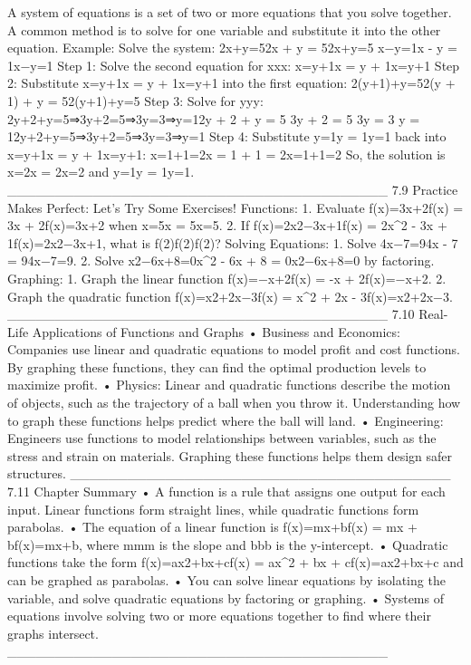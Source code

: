 A system of equations is a set of two or more equations that you solve together. A common method is to solve for one variable and substitute it into the other equation.
Example: Solve the system:
2x+y=52x + y = 52x+y=5 x−y=1x - y = 1x−y=1
Step 1: Solve the second equation for xxx:
x=y+1x = y + 1x=y+1
Step 2: Substitute x=y+1x = y + 1x=y+1 into the first equation:
2(y+1)+y=52(y + 1) + y = 52(y+1)+y=5
Step 3: Solve for yyy:
2y+2+y=5⇒3y+2=5⇒3y=3⇒y=12y + 2 + y = 5 \quad \Rightarrow \quad 3y + 2 = 5 \quad \Rightarrow \quad 3y = 3 \quad \Rightarrow \quad y = 12y+2+y=5⇒3y+2=5⇒3y=3⇒y=1
Step 4: Substitute y=1y = 1y=1 back into x=y+1x = y + 1x=y+1:
x=1+1=2x = 1 + 1 = 2x=1+1=2
So, the solution is x=2x = 2x=2 and y=1y = 1y=1.
________________________________________
7.9 Practice Makes Perfect: Let’s Try Some Exercises!
Functions:
1.	Evaluate f(x)=3x+2f(x) = 3x + 2f(x)=3x+2 when x=5x = 5x=5.
2.	If f(x)=2x2−3x+1f(x) = 2x^2 - 3x + 1f(x)=2x2−3x+1, what is f(2)f(2)f(2)?
Solving Equations:
1.	Solve 4x−7=94x - 7 = 94x−7=9.
2.	Solve x2−6x+8=0x^2 - 6x + 8 = 0x2−6x+8=0 by factoring.
Graphing:
1.	Graph the linear function f(x)=−x+2f(x) = -x + 2f(x)=−x+2.
2.	Graph the quadratic function f(x)=x2+2x−3f(x) = x^2 + 2x - 3f(x)=x2+2x−3.
________________________________________
7.10 Real-Life Applications of Functions and Graphs
•	Business and Economics: Companies use linear and quadratic equations to model profit and cost functions. By graphing these functions, they can find the optimal production levels to maximize profit.
•	Physics: Linear and quadratic functions describe the motion of objects, such as the trajectory of a ball when you throw it. Understanding how to graph these functions helps predict where the ball will land.
•	Engineering: Engineers use functions to model relationships between variables, such as the stress and strain on materials. Graphing these functions helps them design safer structures.
________________________________________
7.11 Chapter Summary
•	A function is a rule that assigns one output for each input. Linear functions form straight lines, while quadratic functions form parabolas.
•	The equation of a linear function is f(x)=mx+bf(x) = mx + bf(x)=mx+b, where mmm is the slope and bbb is the y-intercept.
•	Quadratic functions take the form f(x)=ax2+bx+cf(x) = ax^2 + bx + cf(x)=ax2+bx+c and can be graphed as parabolas.
•	You can solve linear equations by isolating the variable, and solve quadratic equations by factoring or graphing.
•	Systems of equations involve solving two or more equations together to find where their graphs intersect.
________________________________________
